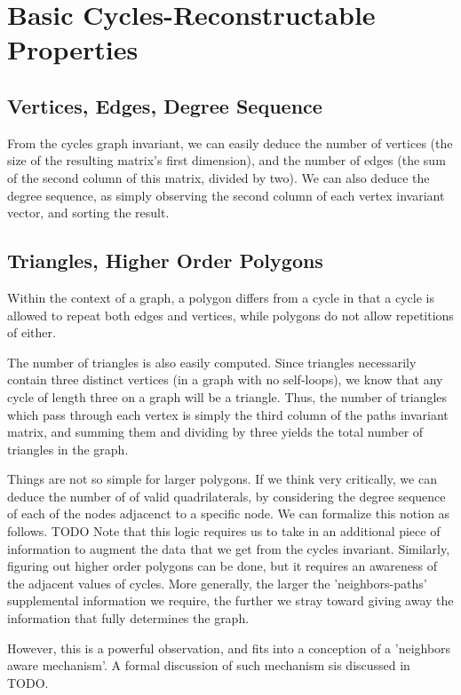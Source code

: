 \documentclass[11pt,a4paper]{report}
\begin{document}
\section{Basic Cycles-Reconstructable Properties}

\subsection{Vertices, Edges, Degree Sequence}
From the cycles graph invariant, we can easily deduce the number of vertices (the size of the resulting matrix's first dimension), and the number of edges (the sum of the second column of this matrix, divided by two).
We can also deduce the degree sequence, as simply observing the second column of each vertex invariant vector, and sorting the result.

\subsection{Triangles, Higher Order Polygons}
Within the context of a graph, a polygon differs from a cycle in that a cycle is allowed to repeat both edges and vertices, while polygons do not allow repetitions of either.

The number of triangles is also easily computed.  Since triangles necessarily contain three distinct vertices (in a graph with no self-loops), we know that any cycle of length three on a graph will be a triangle.
Thus, the number of triangles which pass through each vertex is simply the third column of the paths invariant matrix, and summing them and dividing by three yields the total number of triangles in the graph.

Things are not so simple for larger polygons.  If we think very critically, we can deduce the number of of valid quadrilaterals, by considering the degree sequence of each of the nodes adjacenct to a specific node.
We can formalize this notion as follows.
TODO
Note that this logic requires us to take in an additional piece of information to augment the data that we get from the cycles invariant.
Similarly, figuring out higher order polygons can be done, but it requires an awareness of the adjacent values of cycles.
More generally, the larger the 'neighbors-paths' supplemental information we require, the further we stray toward giving away the information that fully determines the graph.

However, this is a powerful observation, and fits into a conception of a 'neighbors aware mechanism'. A formal discussion of such mechanism sis discussed in TODO.
\end{document}
